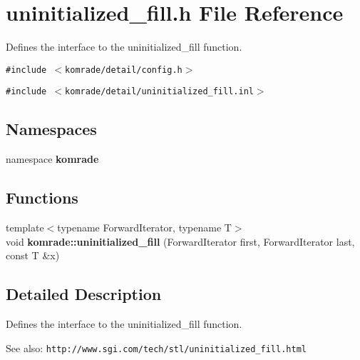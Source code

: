 \section{uninitialized\_\-fill.h File Reference}
\label{uninitialized__fill_8h}
Defines the interface to the uninitialized\_\-fill function. 

{\tt \#include $<$komrade/detail/config.h$>$}\par
{\tt \#include $<$komrade/detail/uninitialized\_\-fill.inl$>$}\par
\subsection*{Namespaces}
\begin{CompactItemize}
\item 
namespace {\bf komrade}
\end{CompactItemize}
\subsection*{Functions}
\begin{CompactItemize}
\item 
{\footnotesize template$<$typename ForwardIterator, typename T$>$ }\\void {\bf komrade::uninitialized\_\-fill} (ForwardIterator first, ForwardIterator last, const T \&x)
\end{CompactItemize}


\subsection{Detailed Description}
Defines the interface to the uninitialized\_\-fill function. 

\begin{Desc}
\item[See also:]{\tt http://www.sgi.com/tech/stl/uninitialized\_\-fill.html} \end{Desc}
